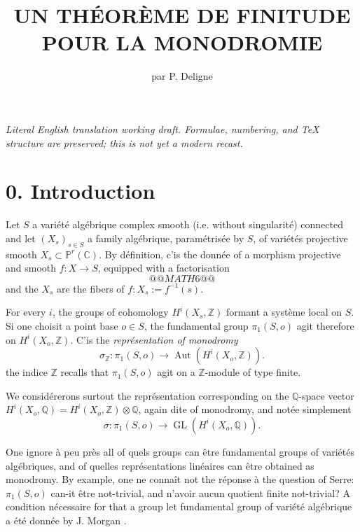 \documentclass[12pt,a4paper]{article}
\title{\textbf{UN TH\'{E}OR\`{E}ME DE FINITUDE POUR LA MONODROMIE}}
\author{par P. Deligne}
\date{}
\theoremstyle{plain}
\theoremstyle{definition}
\DeclareMathOperator{\Aut}{Aut}
\DeclareMathOperator{\GL}{GL}
\newcommand{\CC}{\mathbb{C}}
\newcommand{\QQ}{\mathbb{Q}}
\newcommand{\ZZ}{\mathbb{Z}}
\newcommand{\PP}{\mathbb{P}}
\begin{document}
\begin{center}\small\emph{Literal English translation working draft. Formulae, numbering, and TeX structure are preserved; this is not yet a modern recast.}\end{center}
\vspace{0.5em}


\maketitle

\section*{0. Introduction}

Let $S$ a vari\'{e}t\'{e} alg\'{e}brique complex smooth (i.e. without singularit\'{e}) connected and let $(X_{s})_{s \in S}$ a family alg\'{e}brique, param\'{e}tris\'{e}e by $S$, of vari\'{e}t\'{e}s projective smooth $X_{s} \subset \PP^{r}(\CC)$. By d\'{e}finition, c'is the donn\'{e}e of a morphism projective and smooth $f: X \to S$, equipped with a factorisation
\[
@@MATH6@@
\]
and the $X_{s}$ are the fibers of $f : X_{s} := f^{-1}(s)$.

For every $i$, the groups of cohomology $H^{i}(X_{s}, \ZZ)$ formant a syst\`{e}me local on $S$. Si one choisit a point base $o \in S$, the fundamental group $\pi_{1}(S,o)$ agit therefore on $H^{i}(X_{o}, \ZZ)$. C'is the \emph{repr\'{e}sentation of monodromy}
\[
\sigma_{\ZZ} : \pi_{1}(S,o) \to \Aut(H^{i}(X_{o}, \ZZ)).
\]
the indice $\ZZ$ recalls that $\pi_{1}(S,o)$ agit on a $\ZZ$-module of type finite.

We consid\'{e}rerons surtout the repr\'{e}sentation corresponding on the $\QQ$-space vector $H^{i}(X_{o}, \QQ) = H^{i}(X_{o}, \ZZ) \otimes \QQ$, again dite of monodromy, and not\'{e}e simplement
\[
\sigma : \pi_{1}(S,o) \to \GL(H^{i}(X_{o}, \QQ)).
\]

One ignore \`{a} peu pr\`{e}s all of quels groups can \^{e}tre fundamental groups of vari\'{e}t\'{e}s alg\'{e}briques, and of quelles repr\'{e}sentations lin\'{e}aires can \^{e}tre obtained as monodromy. By example, one ne conna\^{i}t not the r\'{e}ponse \`{a} the question of Serre: $\pi_{1}(S,o)$ can-it \^{e}tre not-trivial, and n'avoir aucun quotient finite not-trivial? A condition n\'{e}cessaire for that a group let fundamental group of vari\'{e}t\'{e} alg\'{e}brique a \'{e}t\'{e} donn\'{e}e by J. Morgan \cite{Morgan}.
\end{document}
